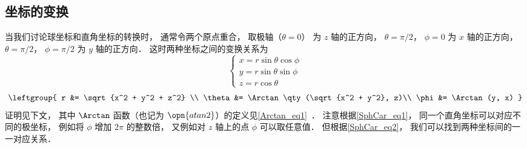 

\subsection{坐标的变换}
当我们讨论球坐标和直角坐标的转换时， 通常令两个原点重合， 取极轴（$\theta = 0$） 为 $z$ 轴的正方向， $\theta = \pi/2$， $\phi = 0$ 为 $x$ 轴的正方向， $\theta = \pi/2$， $\phi = \pi/2$ 为 $y$ 轴的正方向． 这时两种坐标之间的变换关系为
\begin{equation}\label{SphCar_eq1}
\begin{cases}
x = r\sin \theta \cos \phi \\
y = r\sin \theta \sin \phi \\
z = r\cos \theta 
\end{cases}
\end{equation}
\begin{equation}\label{SphCar_eq2}
\leftgroup{
r &= \sqrt {x^2 + y^2 + z^2} \\
\theta  &= \Arctan\qty(\sqrt{x^2 + y^2}, z)\\
\phi  &= \Arctan(y, x)
}\end{equation}
证明见下文， 其中 $\Arctan$ 函数（也记为 $\opn{atan2}$）的定义见\autoref{Arctan_eq1}~． 注意根据\autoref{SphCar_eq1}， 同一个直角坐标可以对应不同的极坐标， 例如将 $\phi$ 增加 $2\pi$ 的整数倍， 又例如对 $z$ 轴上的点 $\phi$ 可以取任意值． 但根据\autoref{SphCar_eq2}， 我们可以找到两种坐标间的一一对应关系．


